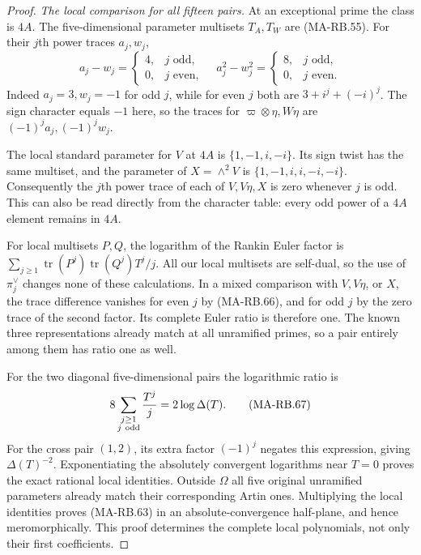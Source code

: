 \begin{proof}
\emph{The local comparison for all fifteen pairs.}
At an exceptional prime the class is \(4A\).
The five-dimensional parameter multisets \(T_A,T_W\)
are (MA-RB.55). For their \(j\)th power traces \(a_j,w_j\),
\[
 a_j-w_j=
  \begin{cases}4,&j\text{ odd},\\0,&j\text{ even},\end{cases}
 \quad
 a_j^2-w_j^2=
  \begin{cases}8,&j\text{ odd},\\0,&j\text{ even}.\end{cases}
 \tag{MA-RB.66}
\]
Indeed \(a_j=3,w_j=-1\) for odd \(j\), while for even
\(j\) both are \(3+i^j+(-i)^j\).
The sign character equals \(-1\) here, so the traces
for \(\varpi\otimes\eta,W\eta\) are
\((-1)^j a_j,(-1)^jw_j\).

The local standard parameter for \(V\) at \(4A\) is
\(\{1,-1,i,-i\}\). Its sign twist has the same multiset,
and the parameter of \(X=\wedge^2V\) is
\(\{1,-1,i,i,-i,-i\}\). Consequently the \(j\)th
power trace of each of \(V,V\eta,X\) is zero whenever
\(j\) is odd. This can also be read directly from the
character table: every odd power of a \(4A\) element
remains in \(4A\).

For local multisets \(P,Q\), the logarithm of the
Rankin Euler factor is
\(\sum_{j\ge1}\operatorname{tr}(P^j)
\operatorname{tr}(Q^j)T^j/j\).
All our local multisets are self-dual, so the use of
\(\pi_j^\vee\) changes none of these calculations.
In a mixed comparison with \(V,V\eta\), or \(X\),
the trace difference vanishes for even \(j\) by
(MA-RB.66), and for odd \(j\) by the zero trace of
the second factor. Its complete Euler ratio is
therefore one. The known three representations
already match at all unramified primes, so a pair
entirely among them has ratio one as well.

For the two diagonal five-dimensional pairs the
logarithmic ratio is
\[
       8\sum_{\substack{j\ge1\\j\ {\rm odd}}}\frac{T^j}{j}
                     =2\log\Delta(T).
 \tag{MA-RB.67}
\]
For the cross pair \((1,2)\), its extra factor
\((-1)^j\) negates this expression, giving
\(\Delta(T)^{-2}\). Exponentiating the absolutely
convergent logarithms near \(T=0\) proves the exact
rational local identities. Outside \(\Omega\) all
five original unramified parameters already match
their corresponding Artin ones.
Multiplying the local identities proves (MA-RB.63)
in an absolute-convergence half-plane, and hence
meromorphically. This proof determines the complete
local polynomials, not only their first coefficients.


\end{proof}
